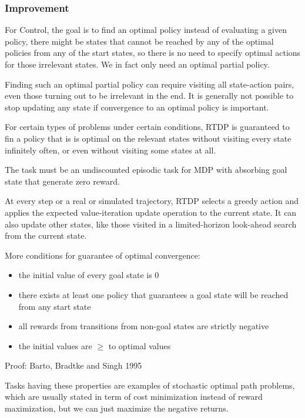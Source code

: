 \documentclass[sutton_barto_notes.tex]{subfiles}
\begin{document}
\subsubsection{Improvement}

For Control, the goal is to find an optimal policy instead of evaluating a given policy, there might be states that cannot be reached by any of the optimal policies from any of the start states, so there is no need to specify optimal actions for those irrelevant states. We in fact only need an optimal partial policy.

Finding such an optimal partial policy can require visiting all state-action pairs, even those turning out to be irrelevant in the end. It is generally not possible to stop updating any state if convergence to an optimal policy is important.

For certain types of problems under certain conditions, RTDP is guaranteed to fin a policy that is is optimal on the relevant states without visiting every state infinitely often, or even without visiting some states at all.

The task must be an undiscounted episodic task for MDP with absorbing goal state that generate zero reward.

At every step or a real or simulated trajectory, RTDP selects a greedy action and applies the expected value-iteration update operation to the current state. It can also update other states, like those visited in a limited-horizon look-ahead search from the current state.

More conditions for guarantee of optimal convergence:

\begin{itemize}
\item the initial value of every goal state is 0
\item there exists at least one policy that guarantees a goal state will be reached from any start state
\item all rewards from transitions from non-goal states are strictly negative
\item the initial values are $\geq$ to optimal values

\end{itemize}

Proof: Barto, Bradtke and Singh 1995

Tasks having these properties are examples of stochastic optimal path problems, which are usually stated in term of cost minimization instead of reward maximization, but we can just maximize the negative returns.
\end{document}
